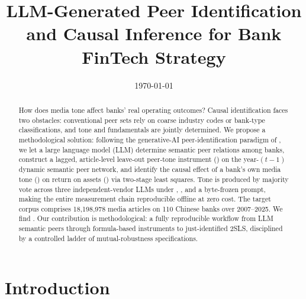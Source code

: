 




\title{LLM-Generated Peer Identification and Causal Inference for Bank FinTech Strategy}
\author{}
\date{\today}


\maketitle

\begin{abstract}
How does media tone affect banks' real operating outcomes? Causal identification faces two
obstacles: conventional peer sets rely on coarse industry codes or bank-type classifications,
and tone and fundamentals are jointly determined. We propose a methodological solution:
following the generative-AI peer-identification paradigm of \textcite{cao2025genai}, we let a
large language model (LLM) determine semantic peer relations among banks, construct a
lagged, article-level leave-out peer-tone instrument () on
the year-$(t-1)$ dynamic semantic peer network, and identify the causal effect of a bank's
own media tone
() on return on assets () via two-stage least squares.
Tone is produced by majority vote across three independent-vendor LLMs under
, , and a byte-frozen prompt, making the entire measurement
chain reproducible offline at zero cost. The target corpus comprises 18{,}198{,}978 media
articles on 110 Chinese banks over 2007--2025. We find . Our contribution is methodological: a fully
reproducible workflow from LLM semantic peers through formula-based instruments to
just-identified 2SLS, disciplined by a controlled ladder of mutual-robustness specifications.
\end{abstract}

\section{Introduction}\label{sec:intro}

